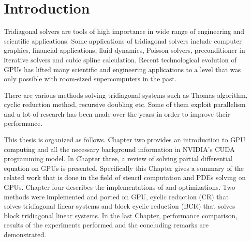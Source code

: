 \chapter{Introduction}

Tridiagonal solvers are tools of high importance in wide range of engineering and scientific applications. Some applications of tridiagonal solvers include computer graphics, financial applications, fluid dynamics, Poisson solvers, preconditioner in iterative solvers and cubic spline calculation. Recent technological evolution of GPUs has lifted many scientific and engineering applications to a level that was only possible with room-sized supercomputers in the past. 

There are various methods solving tridiagonal systems such as Thomas algorithm, cyclic reduction method, recursive doubling etc. Some of them exploit parallelism and a lot of research has been made over the years in order to improve their performance.

This thesis is organized as follows. Chapter two provides an introduction to GPU computing and all the necessary background information in NVIDIA’s CUDA programming model. In Chapter three, a review of solving partial differential equation on GPUs is presented. Specifically this Chapter gives a summary of the related work that is done in the field of stencil computation and PDEs solving on GPUs. Chapter four describes the implementations of  and optimizations. Two methods were implemented and ported on GPU, cyclic reduction (CR) that solves tridiagonal linear systems and block cyclic reduction (BCR) that solves block tridiagonal linear systems. In the last Chapter, performance comparison,  results of the experiments performed and the concluding remarks are demonstrated.

